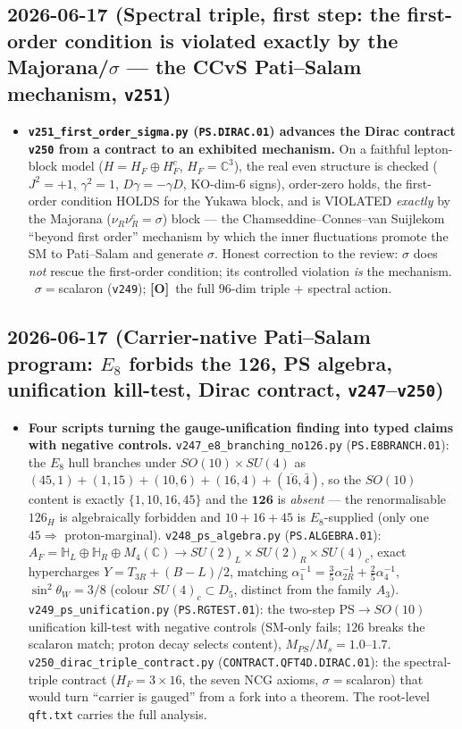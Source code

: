 \documentclass[11pt]{article}
\providecommand{\mO}{\textbf{[O]}}\providecommand{\mX}{\textbf{[X]}}
\providecommand{\vref}[1]{\texttt{#1}}
\begin{document}
\subsection*{2026-06-17 (Spectral triple, first step: the first-order condition is violated exactly by the Majorana/$\sigma$ --- the CCvS Pati--Salam mechanism, \texttt{v251})}
\begin{itemize}
\item \textbf{\texttt{v251\_first\_order\_sigma.py} (\texttt{PS.DIRAC.01}) advances the Dirac contract
  \vref{v250} from a contract to an exhibited mechanism.} On a faithful lepton-block model
  ($H=H_F\oplus H_F^c$, $H_F=\mathbb C^3$), the real even structure is checked ($J^2{=}{+}1$,
  $\gamma^2{=}1$, $D\gamma{=}{-}\gamma D$, KO-dim-6 signs), order-zero holds, the first-order condition
  HOLDS for the Yukawa block, and is VIOLATED \emph{exactly} by the Majorana ($\nu_R\nu_R^c=\sigma$) block
  --- the Chamseddine--Connes--van Suijlekom ``beyond first order'' mechanism by which the inner
  fluctuations promote the SM to Pati--Salam and generate $\sigma$. Honest correction to the review:
  $\sigma$ does \emph{not} rescue the first-order condition; its controlled violation \emph{is} the
  mechanism. \mC\ $\sigma={}$scalaron (\vref{v249}); \mO\ the full $96$-dim triple $+$ spectral action.
\end{itemize}

\subsection*{2026-06-17 (Carrier-native Pati--Salam program: $E_8$ forbids the 126, PS algebra, unification kill-test, Dirac contract, \texttt{v247}--\texttt{v250})}
\begin{itemize}
\item \textbf{Four scripts turning the gauge-unification finding into typed claims with negative controls.}
  \texttt{v247\_e8\_branching\_no126.py} (\texttt{PS.E8BRANCH.01}): the $E_8$ hull branches under
  $SO(10){\times}SU(4)$ as $(45,1){+}(1,15){+}(10,6){+}(16,4){+}(\overline{16},\bar4)$, so the $SO(10)$
  content is exactly $\{1,10,16,45\}$ and the $\mathbf{126}$ is \emph{absent} --- the renormalisable
  $126_H$ is algebraically forbidden and $10{+}16{+}45$ is $E_8$-supplied (only one $45\Rightarrow$
  proton-marginal). \texttt{v248\_ps\_algebra.py} (\texttt{PS.ALGEBRA.01}):
  $A_F=\mathbb H_L\oplus\mathbb H_R\oplus M_4(\mathbb C)\to SU(2)_L{\times}SU(2)_R{\times}SU(4)_c$, exact
  hypercharges $Y=T_{3R}+(B{-}L)/2$, matching $\alpha_1^{-1}=\tfrac35\alpha_{2R}^{-1}+\tfrac25\alpha_4^{-1}$,
  $\sin^2\theta_W=3/8$ (colour $SU(4)_c\subset D_5$, distinct from the family $A_3$).
  \texttt{v249\_ps\_unification.py} (\texttt{PS.RGTEST.01}): the two-step PS$\to SO(10)$ unification kill-test
  with negative controls (SM-only fails; $126$ breaks the scalaron match; proton decay selects content),
  $M_{PS}/M_s=1.0$--$1.7$. \texttt{v250\_dirac\_triple\_contract.py} (\texttt{CONTRACT.QFT4D.DIRAC.01}): the
  spectral-triple contract ($H_F=3{\times}16$, the seven NCG axioms, $\sigma=$scalaron) that would turn
  ``carrier is gauged'' from a fork into a theorem. The root-level \texttt{qft.txt} carries the full analysis.
\end{itemize}
\end{document}
